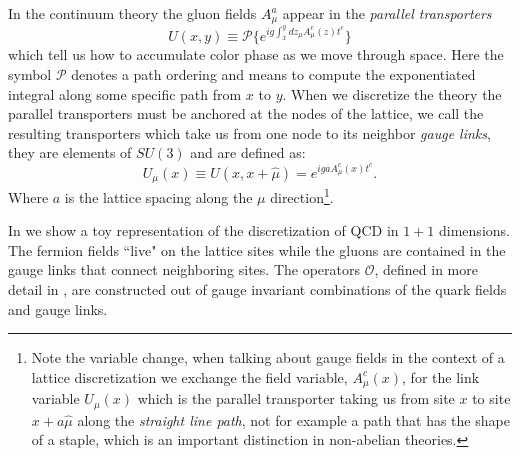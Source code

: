 In the continuum theory the gluon fields $A^a_\mu$ appear in the \emph{parallel transporters} 
\begin{equation*}
U(x,y) \equiv \mathcal{P}\{e^{ig \int_x^y dz_\mu A^c_\mu(z) t^c }\}
\end{equation*} 
which tell us how to accumulate color phase as we move through space. Here the symbol $\mathcal{P}$ denotes a path ordering and means to compute the exponentiated integral along some specific path from $x$ to $y$. When we discretize the theory the parallel transporters must be anchored at the nodes of the lattice, we call the resulting transporters which take us from one node to its neighbor \emph{gauge links}, they are elements of $SU(3)$ and are defined as: 
\begin{equation*}
U_\mu(x) \equiv U(x,x+\hat{\mu}) =  e^{ig a A^c_\mu(x) t^c }. 
\end{equation*} 
Where $a$ is the lattice spacing along the $\mu$ direction\footnote{Note the variable change, when talking about gauge fields in the context of a lattice discretization we exchange the field variable, $A^c_\mu(x)$, for the link variable $U_\mu(x)$ which is the parallel transporter taking us from site $x$ to site $x+a\hat{\mu}$ along the \emph{straight line path}, not for example a path that has the shape of a staple, which is an important distinction in non-abelian theories.}. 

In  we show a toy representation of the discretization of QCD in $1+1$ dimensions. The fermion fields ``live" on the lattice sites while the gluons are contained in the gauge links that connect neighboring sites. The operators $\mathcal{O}$,  defined in more detail in , are constructed out of gauge invariant combinations of the quark fields and gauge links. 



